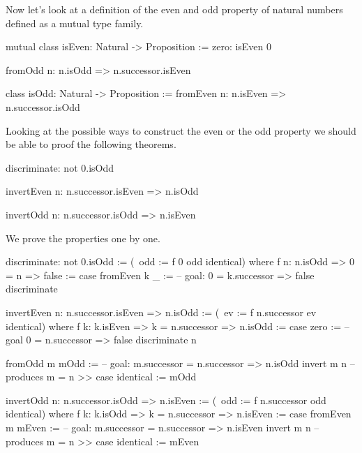 \vskip 5mm
Now let's look at a definition of the even and odd property of natural numbers
defined as a mutual type family.
%
\begin{alba}
    mutual
        class
            isEven: Natural -> Proposition
        :=
            zero: isEven 0

            fromOdd n: n.isOdd => n.successor.isEven

        class
            isOdd: Natural -> Proposition
        :=
            fromEven n: n.isEven => n.successor.isOdd
\end{alba}
%
Looking at the possible ways to construct the even or the odd property we should
be able to proof the following theorems.
%
\begin{alba}
    discriminate: not 0.isOdd

    invertEven n: n.successor.isEven => n.isOdd

    invertOdd  n: n.successor.isOdd  => n.isEven
\end{alba}


\noindent We prove the properties one by one.

\begin{alba}
    discriminate: not 0.isOdd :=
        (\ odd := f 0 odd identical)
        where
        f n: n.isOdd => 0 = n => false
        :=
            case
                fromEven k _ :=
                    -- goal: 0 = k.successor => false
                    discriminate

    invertEven n: n.successor.isEven => n.isOdd
    :=
        (\ ev := f n.successor ev identical)
        where
        f k: k.isEven => k = n.successor => n.isOdd
        :=
            case
                zero :=
                    -- goal 0 = n.successor => false
                    discriminate n

                fromOdd m mOdd :=
                    -- goal: m.successor = n.successor => n.isOdd
                    invert m n -- produces m = n
                    >>
                    case
                        identical := mOdd

    invertOdd n: n.successor.isOdd => n.isEven
    :=
        (\ odd := f n.successor odd identical)
        where
        f k: k.isOdd => k = n.successor => n.isEven
        :=
            case
                fromEven m mEven :=
                    -- goal: m.successor = n.successor => n.isEven
                    invert m n -- produces m = n
                    >>
                    case
                        identical := mEven
\end{alba}

